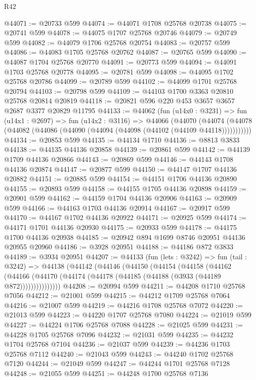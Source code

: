 \begin{lexlean}{R42}
\begin{coremodule}
@44071 := @20733 @599
@44074 := @44071 @1708 @25768 @20738
@44075 := @20741 @599
@44078 := @44075 @1707 @25768 @20746
@44079 := @20749 @599
@44082 := @44079 @1706 @25768 @20754
@44083 := @20757 @599
@44086 := @44083 @1705 @25768 @20762
@44087 := @20765 @599
@44090 := @44087 @1704 @25768 @20770
@44091 := @20773 @599
@44094 := @44091 @1703 @25768 @20778
@44095 := @20781 @599
@44098 := @44095 @1702 @25768 @20786
@44099 := @20789 @599
@44102 := @44099 @1701 @25768 @20794
@44103 := @20798 @599
@44109 := @44103 @1700 @3363 @20810 @25768 @20814 @20819
@44118 := @20821 @596 @220 @453 @3657 @3657 @2687 @3377 @20829 @11795
@44133 := @44062
    (fun (u14x0 : @3231) =>
    fun (u14x1 : @2697) =>
    fun (u14x2 : @3116) =>
    @44066
      (@44070
        (@44074 (@44078 (@44082 (@44086 (@44090 (@44094 (@44098 (@44102 (@44109 @44118)))))))))))
@44134 := @20853 @599
@44135 := @44134 @1710
@44136 := @8813 @3833
@44138 := @44135 @44136 @20858
@44139 := @20861 @599
@44142 := @44139 @1709 @44136 @20866
@44143 := @20869 @599
@44146 := @44143 @1708 @44136 @20874
@44147 := @20877 @599
@44150 := @44147 @1707 @44136 @20882
@44151 := @20885 @599
@44154 := @44151 @1706 @44136 @20890
@44155 := @20893 @599
@44158 := @44155 @1705 @44136 @20898
@44159 := @20901 @599
@44162 := @44159 @1704 @44136 @20906
@44163 := @20909 @599
@44166 := @44163 @1703 @44136 @20914
@44167 := @20917 @599
@44170 := @44167 @1702 @44136 @20922
@44171 := @20925 @599
@44174 := @44171 @1701 @44136 @20930
@44175 := @20933 @599
@44178 := @44175 @1700 @44136 @20938
@44185 := @20942 @894 @1699 @8746 @20951 @44136 @20955 @20960
@44186 := @3928 @20951
@44188 := @44186 @872 @3833
@44189 := @3934 @20951
@44207 := @44133
    (fun (lets : @3242) =>
    fun (tail : @3242) =>
    @44138
      (@44142
        (@44146
          (@44150
            (@44154
              (@44158
                (@44162
                  (@44166 (@44170 (@44174 (@44178 (@44185 (@44188 (@3933 (@44189 @872)))))))))))))))
@44208 := @20994 @599
@44211 := @44208 @1710 @25768 @7056
@44212 := @21001 @599
@44215 := @44212 @1709 @25768 @7064
@44216 := @21007 @599
@44219 := @44216 @1708 @25768 @7072
@44220 := @21013 @599
@44223 := @44220 @1707 @25768 @7080
@44224 := @21019 @599
@44227 := @44224 @1706 @25768 @7088
@44228 := @21025 @599
@44231 := @44228 @1705 @25768 @7096
@44232 := @21031 @599
@44235 := @44232 @1704 @25768 @7104
@44236 := @21037 @599
@44239 := @44236 @1703 @25768 @7112
@44240 := @21043 @599
@44243 := @44240 @1702 @25768 @7120
@44244 := @21049 @599
@44247 := @44244 @1701 @25768 @7128
@44248 := @21055 @599
@44251 := @44248 @1700 @25768 @7136

\end{coremodule}
\end{lexlean}
